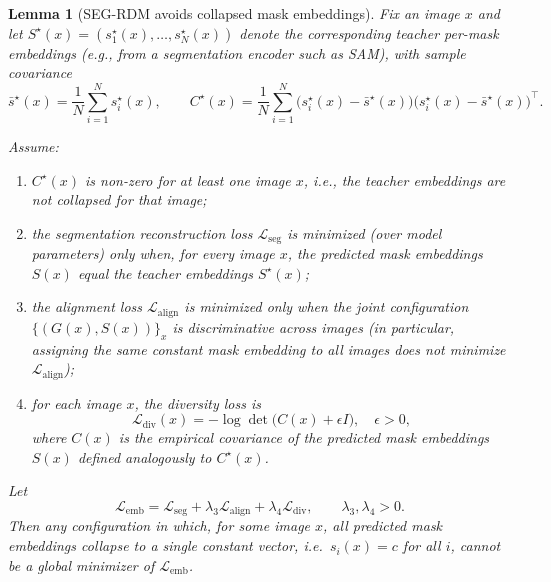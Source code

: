 \documentclass[12pt]{article}
\newtheorem{lemma}{Lemma}
\begin{document}
\begin{lemma}[SEG-RDM avoids collapsed mask embeddings]
Fix an image $x$ and let $S^\star(x) = (s^\star_1(x),\dots,s^\star_N(x))$
denote the corresponding teacher per-mask embeddings (e.g., from a
segmentation encoder such as SAM), with sample covariance
\[
\bar{s}^\star(x) = \frac{1}{N} \sum_{i=1}^N s^\star_i(x), \qquad
C^\star(x) = \frac{1}{N} \sum_{i=1}^N
\big(s^\star_i(x) - \bar{s}^\star(x)\big)\big(s^\star_i(x) - \bar{s}^\star(x)\big)^\top.
\]

Assume:
\begin{enumerate}
    \item[(i)] $C^\star(x)$ is non-zero for at least one image $x$, i.e.,
    the teacher embeddings are not collapsed for that image;
    \item[(ii)] the segmentation reconstruction loss $\mathcal{L}_{\mathrm{seg}}$
    is minimized (over model parameters) only when, for every image $x$,
    the predicted mask embeddings $S(x)$ equal the teacher embeddings
    $S^\star(x)$;
    \item[(iii)] the alignment loss $\mathcal{L}_{\mathrm{align}}$ is minimized
    only when the joint configuration $\{(G(x), S(x))\}_x$ is discriminative
    across images (in particular, assigning the same constant mask embedding
    to all images does not minimize $\mathcal{L}_{\mathrm{align}}$);
    \item[(iv)] for each image $x$, the diversity loss is
    \[
    \mathcal{L}_{\mathrm{div}}(x)
    = - \log \det\big(C(x) + \epsilon I\big), \quad \epsilon > 0,
    \]
    where $C(x)$ is the empirical covariance of the predicted mask embeddings
    $S(x)$ defined analogously to $C^\star(x)$.
\end{enumerate}

Let
\[
\mathcal{L}_{\mathrm{emb}}
= \mathcal{L}_{\mathrm{seg}}
+ \lambda_3 \mathcal{L}_{\mathrm{align}}
+ \lambda_4 \mathcal{L}_{\mathrm{div}},
\qquad \lambda_3,\lambda_4 > 0.
\]
Then any configuration in which, for some image $x$, all predicted mask
embeddings collapse to a single constant vector, i.e.\ $s_i(x) = c$ for all $i$,
cannot be a global minimizer of $\mathcal{L}_{\mathrm{emb}}$.
\end{lemma}
\end{document}
